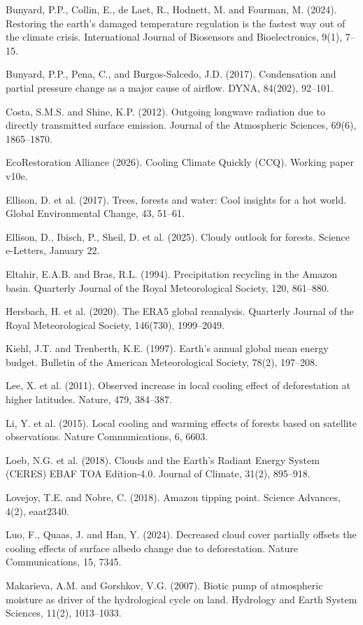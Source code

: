 Bunyard, P.P., Collin, E., de Laet, R., Hodnett, M. and Fourman, M.
(2024). Restoring the earth's damaged temperature regulation is the
fastest way out of the climate crisis. International Journal of
Biosensors and Bioelectronics, 9(1), 7--15.

Bunyard, P.P., Pena, C., and Burgos-Salcedo, J.D. (2017). Condensation
and partial pressure change as a major cause of airflow. DYNA, 84(202),
92--101.

Costa, S.M.S. and Shine, K.P. (2012). Outgoing longwave radiation due to
directly transmitted surface emission. Journal of the Atmospheric
Sciences, 69(6), 1865--1870.

EcoRestoration Alliance (2026). Cooling Climate Quickly (CCQ). Working
paper v10e.

Ellison, D. et al. (2017). Trees, forests and water: Cool insights for a
hot world. Global Environmental Change, 43, 51--61.

Ellison, D., Ibisch, P., Sheil, D. et al. (2025). Cloudy outlook for
forests. Science e-Letters, January 22.

Eltahir, E.A.B. and Bras, R.L. (1994). Precipitation recycling in the
Amazon basin. Quarterly Journal of the Royal Meteorological Society,
120, 861--880.

Hersbach, H. et al. (2020). The ERA5 global reanalysis. Quarterly
Journal of the Royal Meteorological Society, 146(730), 1999--2049.

Kiehl, J.T. and Trenberth, K.E. (1997). Earth's annual global mean
energy budget. Bulletin of the American Meteorological Society, 78(2),
197--208.

Lee, X. et al. (2011). Observed increase in local cooling effect of
deforestation at higher latitudes. Nature, 479, 384--387.

Li, Y. et al. (2015). Local cooling and warming effects of forests based
on satellite observations. Nature Communications, 6, 6603.

Loeb, N.G. et al. (2018). Clouds and the Earth's Radiant Energy System
(CERES) EBAF TOA Edition-4.0. Journal of Climate, 31(2), 895--918.

Lovejoy, T.E. and Nobre, C. (2018). Amazon tipping point. Science
Advances, 4(2), eaat2340.

Luo, F., Quaas, J. and Han, Y. (2024). Decreased cloud cover partially
offsets the cooling effects of surface albedo change due to
deforestation. Nature Communications, 15, 7345.

Makarieva, A.M. and Gorshkov, V.G. (2007). Biotic pump of atmospheric
moisture as driver of the hydrological cycle on land. Hydrology and
Earth System Sciences, 11(2), 1013--1033.

